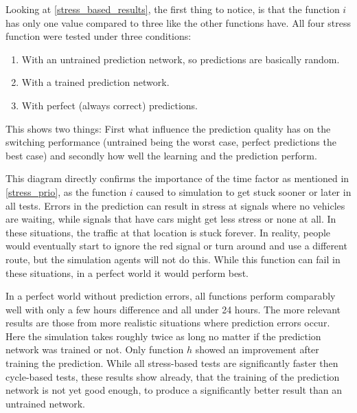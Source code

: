 Looking at \autoref{stress_based_results}, the first thing to notice, is that the function $i$ has only one value compared to three like the other functions have. All four stress function were tested under three conditions:

\begin{enumerate}
	\item With an untrained prediction network, so predictions are basically random.
	\item With a trained prediction network.
	\item With perfect (always correct) predictions.
\end{enumerate}

This shows two things: First what influence the prediction quality has on the switching performance (untrained being the worst case, perfect predictions the best case) and secondly how well the learning and the prediction perform.

This diagram directly confirms the importance of the time factor as mentioned in \autoref{stress_prio}, as the function $i$ caused to simulation to get stuck sooner or later in all tests. Errors in the prediction can result in stress at signals where no vehicles are waiting, while signals that have cars might get less stress or none at all. In these situations, the traffic at that location is stuck forever. In reality, people would eventually start to ignore the red signal or turn around and use a different route, but the simulation agents will not do this. While this function can fail in these situations, in a perfect world it would perform best.

In a perfect world without prediction errors, all functions perform comparably well with only a few hours difference and all under 24 hours. The more relevant results are those from more realistic situations where prediction errors occur. Here the simulation takes roughly twice as long no matter if the prediction network was trained or not. Only function $h$ showed an improvement after training the prediction. While all stress-based tests are significantly faster then cycle-based tests, these results show already, that the training of the prediction network is not yet good enough, to produce a significantly better result than an untrained network.

